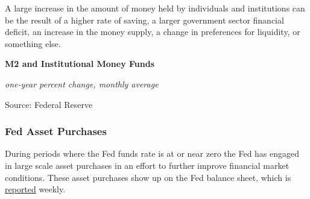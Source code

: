\documentclass{report}
\makeatletter
\newcommand{\tbllink}[1]{\href{https://raw.githubusercontent.com/bdecon/US-chartbook/master/chartbook/data/#1}{\faTable}}
\newcommand*\short[1]{\expandafter\@gobbletwo\number\numexpr#1\relax}
\newcommand{\dateaxisticks}{
		date coordinates in=x, axis line style={draw=none},
		xmax={2020-08-10},
		max space between ticks=40,	    
		xtick={{1990-01-01}, {1992-01-01}, {1994-01-01}, 
			{1996-01-01}, {1998-01-01}, {2000-01-01}, 
			{2002-01-01}, {2004-01-01}, {2006-01-01},
			{2008-01-01}, {2010-01-01}, {2012-01-01}, {2014-01-01},
		    {2016-01-01}, {2018-01-01}, {2020-01-01}},
		minor xtick={{1989-01-01}, {1991-01-01}, {1993-01-01},
			{1995-01-01}, {1997-01-01}, {1999-01-01}, 
			{2001-01-01}, {2003-01-01}, {2005-01-01}, {2007-01-01},
		    {2009-01-01}, {2011-01-01}, {2013-01-01}, {2015-01-01},
		    {2017-01-01}, {2019-01-01}},
		enlarge y limits={0.06}, enlarge x limits={0.01},
		}
\newcommand{\bbar}[2]{extra #1 ticks = {{#2}}, extra #1 tick labels = ,
		extra #1 tick style = {grid=major, grid style={thick, black!25}},}
\newcommand{\thickline}[4]{\addplot[ultra thick, no markers, color=#1] 
		table [x=#2, y=#3, col sep=comma] {#4};	}
\newcommand{\rbars}{
		\fill[color=black!10] (axis cs:{1990-07-01},\pgfkeysvalueof{/pgfplots/ymin}) rectangle 
			(axis cs:{1991-03-01}, \pgfkeysvalueof{/pgfplots/ymax});
		\fill[color=black!10] (axis cs:{2007-12-01},\pgfkeysvalueof{/pgfplots/ymin}) rectangle 
			(axis cs:{2009-07-01}, \pgfkeysvalueof{/pgfplots/ymax});
		\fill[color=black!10] (axis cs:{2001-03-01},\pgfkeysvalueof{/pgfplots/ymin}) rectangle 
			(axis cs:{2001-11-01}, \pgfkeysvalueof{/pgfplots/ymax});
		\fill[color=black!10] (axis cs:{2020-02-01},\pgfkeysvalueof{/pgfplots/ymin}) rectangle 
			(axis cs:{2020-09-01}, \pgfkeysvalueof{/pgfplots/ymax});}
\makeatother
\begin{document}
{{{{{{{{{\begin{minipage}{0.76\textwidth}
A large increase in the amount of money held by individuals and institutions can be the result of a higher rate of saving, a larger government sector financial deficit, an increase in the money supply, a change in preferences for liquidity, or something else. 

\vspace{4mm}

\normalsize \textbf{M2 and Institutional Money Funds}

\footnotesize{\textit{one-year percent change, monthly average}}

\hspace*{-2mm} 

\footnotesize{Source: Federal Reserve} \hfill \tbllink{M2imf.csv}

\end{minipage}


\newpage

\subsubsection*{\color{black!70} \seriffont Fed Asset Purchases}

\begin{minipage}{0.76\textwidth}

\small During periods where the Fed funds rate is at or near zero the Fed has engaged in large scale asset purchases in an effort to further improve financial market conditions. These asset purchases show up on the Fed balance sheet, which is \href{https://www.federalreserve.gov/releases/h41/current/default.htm}{reported} weekly. \\



\end{minipage}

\begin{minipage}{0.39\textwidth}

\vspace{2mm}


\end{minipage}}}}}}}}}}
\end{document}

